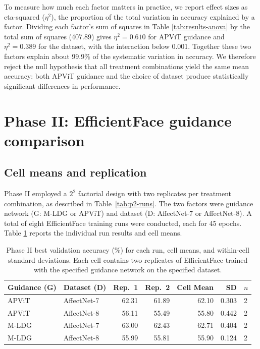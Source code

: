 To measure how much each factor matters in practice, we report effect sizes as eta-squared ($\eta^2$), the proportion of the total variation in accuracy explained by a factor. Dividing each factor's sum of squares in Table \ref{tab:results-anova} by the total sum of squares (407.89) gives $\eta^2 = 0.610$ for APViT guidance and $\eta^2 = 0.389$ for the dataset, with the interaction below 0.001. Together these two factors explain about 99.9\% of the systematic variation in accuracy. We therefore reject the null hypothesis that all treatment combinations yield the same mean accuracy: both APViT guidance and the choice of dataset produce statistically significant differences in performance.

\section{Phase II: EfficientFace guidance comparison}
\label{section:results-phase2}

\subsection{Cell means and replication}
\label{section:results-phase2-cells}

Phase II employed a $2^2$ factorial design with two replicates per treatment combination, as described in Table~\ref{tab:p2-runs}. The two factors were guidance network (G: M-LDG or APViT) and dataset (D: AffectNet-7 or AffectNet-8). A total of eight EfficientFace training runs were conducted, each for 45 epochs. Table \ref{tab:results-p2-cells} reports the individual run results and cell means.\\

\begin{table}[h!]
    \centering
    \begin{tabular}{@{}llrrrrl@{}}
    \toprule
    \textbf{Guidance (G)} & \textbf{Dataset (D)} & \textbf{Rep.\ 1} & \textbf{Rep.\ 2} & \textbf{Cell Mean} & \textbf{SD} & \textbf{$n$} \\
    \midrule
    APViT  & AffectNet-7 & 62.31 & 61.89 & 62.10 & 0.303 & 2 \\
    APViT  & AffectNet-8 & 56.11 & 55.49 & 55.80 & 0.442 & 2 \\
    M-LDG  & AffectNet-7 & 63.00 & 62.43 & 62.71 & 0.404 & 2 \\
    M-LDG  & AffectNet-8 & 55.99 & 55.81 & 55.90 & 0.124 & 2 \\
    \bottomrule
    \end{tabular}
    \caption[Phase II cell means and replicate results]{Phase II best validation accuracy (\%) for each run, cell means, and within-cell standard deviations. Each cell contains two replicates of EfficientFace trained with the specified guidance network on the specified dataset.}
    \label{tab:results-p2-cells}
\end{table}

